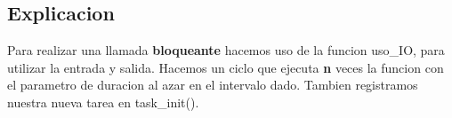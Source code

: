 \subsection{Explicacion}

Para realizar una llamada \textbf{bloqueante} hacemos uso de la funcion uso\_IO, para utilizar la entrada y salida. Hacemos un ciclo que ejecuta \textbf{n} veces la funcion con el parametro de duracion al azar en el intervalo dado.
Tambien registramos nuestra nueva tarea en task\_init().
